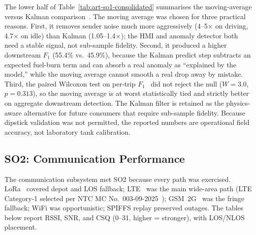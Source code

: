 \documentclass[10pt,journal]{IEEEtran}
\begin{document}
The lower half of Table~\ref{tab:art-so1-consolidated} summarises the moving-average versus Kalman comparison~\cite{kalman1960new}. The moving average was chosen for three practical reasons. First, it removes sender noise much more aggressively (4--5$\times$ on driving, 4.7$\times$ on idle) than Kalman (1.05--1.4$\times$); the HMI and anomaly detector both need a stable signal, not sub-sample fidelity. Second, it produced a higher downstream $F_1$ (55.4\% vs.\ 45.9\%), because the Kalman predict step subtracts an expected fuel-burn term and can absorb a real anomaly as ``explained by the model,'' while the moving average cannot smooth a real drop away by mistake. Third, the paired Wilcoxon test on per-trip $F_1$~\cite{wilcoxon1945individual} did not reject the null ($W = 3.0$, $p = 0.313$), so the moving average is at worst statistically tied and strictly better on aggregate downstream detection. The Kalman filter is retained as the physics-aware alternative for future consumers that require sub-sample fidelity. Because dipstick validation was not permitted, the reported numbers are operational field accuracy, not laboratory tank calibration.

\subsection{SO2: Communication Performance}
The communication subsystem met SO2 because every path was exercised. LoRa~\cite{devalal2018lora} covered depot and LOS fallback; LTE~\cite{miyim2019lte_performance} was the main wide-area path (LTE Category-1 selected per NTC MC No.~003-09-2025~\cite{ntc2025legacy_network_phaseout}); GSM~2G~\cite{iec_gsm_tutorial} was the fringe fallback; WiFi was opportunistic; SPIFFS replay preserved outages. The tables below report RSSI, SNR, and CSQ (0--31, higher = stronger), with LOS/NLOS placement.
\end{document}

